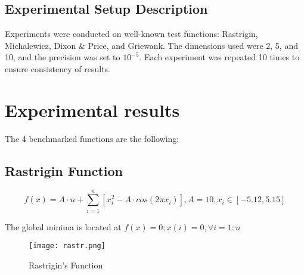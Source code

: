 \documentclass{article}
\begin{document}
\subsection{Experimental Setup Description}
Experiments were conducted on well-known test functions: Rastrigin, Michalewicz, Dixon \& Price, and Griewank. The dimensions used were 2, 5, and 10, and the precision was set to $10^{-5}$. Each experiment was repeated 10 times to ensure consistency of results.

\section{Experimental results}
The 4 benchmarked functions are the following:
\subsection{Rastrigin Function\cite{Rastrigin}}

$$ f(x) = A \cdot n + \sum_{i=1}^n \left[ x_i^2 - A \cdot cos(2 \pi x_i) \right],
A = 10, x_i \in \left[ -5.12, 5.15 \right]$$

The global minima is located at $f(x)=0; x(i)=0,  \forall i=1:n $
\begin{figure}[!h]
  \texttt{[image: rastr.png]}
  \caption{Rastrigin's Function\cite{rast_img}}
\end{figure}
\end{document}
